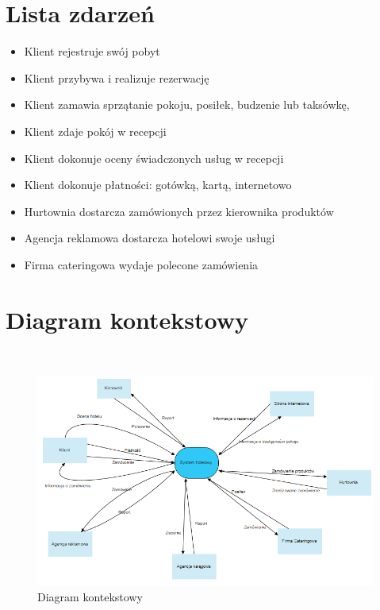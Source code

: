 \documentclass[a4paper, 11pt]{article}
\begin{document}
	
	\section{Lista zdarzeń}
	
	
	\indent
	\begin{itemize}
		
		\item Klient rejestruje swój pobyt
		\item Klient przybywa i realizuje rezerwację
		\item Klient zamawia sprzątanie pokoju, posiłek, budzenie lub taksówkę,
		\item Klient zdaje pokój w recepcji
		\item Klient dokonuje oceny świadczonych usług w recepcji
		\item Klient dokonuje płatności: gotówką, kartą, internetowo
		\item Hurtownia dostarcza zamówionych przez kierownika produktów
		\item Agencja reklamowa dostarcza hotelowi swoje usługi
		\item Firma cateringowa wydaje polecone zamówienia
		\\
	\end{itemize}
	

	
	\section{Diagram kontekstowy}
	\indent
		\\
	\begin{figure}[H]%
			\includegraphics[scale=0.8]{Img/kontekstowy.png}\caption{Diagram kontekstowy}
	\end{figure}
\end{document}
